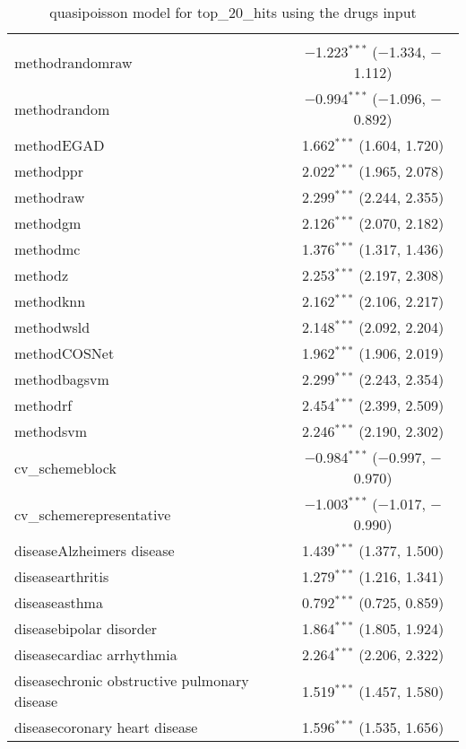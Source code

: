 
\begin{table}[!htbp] \centering 
  \caption{quasipoisson model for top_20_hits using the drugs input} 
  \label{} 
\begin{tabular}{@{\extracolsep{5pt}}lc} 
\\[-1.8ex]\hline 
\hline \\[-1.8ex] 
 methodrandomraw & $-$1.223$^{***}$ ($-$1.334, $-$1.112) \\ 
  methodrandom & $-$0.994$^{***}$ ($-$1.096, $-$0.892) \\ 
  methodEGAD & 1.662$^{***}$ (1.604, 1.720) \\ 
  methodppr & 2.022$^{***}$ (1.965, 2.078) \\ 
  methodraw & 2.299$^{***}$ (2.244, 2.355) \\ 
  methodgm & 2.126$^{***}$ (2.070, 2.182) \\ 
  methodmc & 1.376$^{***}$ (1.317, 1.436) \\ 
  methodz & 2.253$^{***}$ (2.197, 2.308) \\ 
  methodknn & 2.162$^{***}$ (2.106, 2.217) \\ 
  methodwsld & 2.148$^{***}$ (2.092, 2.204) \\ 
  methodCOSNet & 1.962$^{***}$ (1.906, 2.019) \\ 
  methodbagsvm & 2.299$^{***}$ (2.243, 2.354) \\ 
  methodrf & 2.454$^{***}$ (2.399, 2.509) \\ 
  methodsvm & 2.246$^{***}$ (2.190, 2.302) \\ 
  cv\_schemeblock & $-$0.984$^{***}$ ($-$0.997, $-$0.970) \\ 
  cv\_schemerepresentative & $-$1.003$^{***}$ ($-$1.017, $-$0.990) \\ 
  diseaseAlzheimers disease & 1.439$^{***}$ (1.377, 1.500) \\ 
  diseasearthritis & 1.279$^{***}$ (1.216, 1.341) \\ 
  diseaseasthma & 0.792$^{***}$ (0.725, 0.859) \\ 
  diseasebipolar disorder & 1.864$^{***}$ (1.805, 1.924) \\ 
  diseasecardiac arrhythmia & 2.264$^{***}$ (2.206, 2.322) \\ 
  diseasechronic obstructive pulmonary disease & 1.519$^{***}$ (1.457, 1.580) \\ 
  diseasecoronary heart disease & 1.596$^{***}$ (1.535, 1.656) \\ 

\end{tabular}
\end{table}
